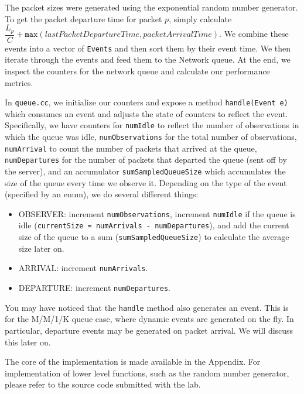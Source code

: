 \documentclass{article}
\begin{document}
The packet sizes were generated using the exponential random number generator. To get the packet departure time for packet $p$, simply calculate
$\dfrac{L_p}{C} + \texttt{max}(lastPacketDepartureTime, packetArrivalTime)$. We combine these events into a vector of \texttt{Events} and then sort
them by their event time. We then iterate through the events and feed them to the Network queue.
At the end, we inspect the counters for the network queue and calculate our performance metrics. \newline

In \texttt{queue.cc}, we initialize our counters and expose a method \texttt{handle(Event e)} which consumes an event and adjusts the state of counters
to reflect the event. Specifically, we have counters for \texttt{numIdle} to reflect the number of observations in which the queue was idle,
\texttt{numObservations} for the total number of observations, \texttt{numArrival} to count the number of packets that arrived at the queue,
\texttt{numDepartures} for the number of packets that departed the queue (sent off by the server), and an accumulator \texttt{sumSampledQueueSize} which
accumulates the size of the queue every time we observe it. Depending on the type of the event (specified by an enum), we do several different things:

\begin{itemize}
    \item OBSERVER: increment \texttt{numObservations}, increment \texttt{numIdle} if the queue is idle (\texttt{currentSize = numArrivals - numDepartures}), and add
        the current size of the queue to a sum (\texttt{sumSampledQueueSize}) to calculate the average size later on.
    \item ARRIVAL: increment \texttt{numArrivals}.
    \item DEPARTURE: increment \texttt{numDepartures}.
\end{itemize}

You may have noticed that the \texttt{handle} method also generates an event. This is for the M/M/1/K queue case, where dynamic events are generated on the fly. In particular,
departure events may be generated on packet arrival. We will discuss this later on. \newline

The core of the implementation is made available in the Appendix. For implementation of lower level functions, such as the random number generator, please refer
to the source code submitted with the lab.
\end{document}
